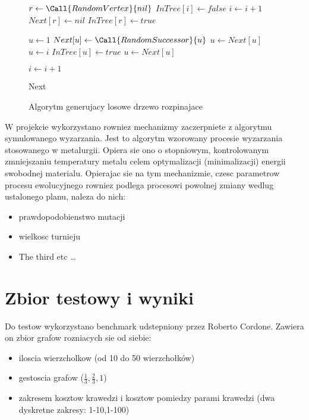 \documentclass[12pt]{article}
\begin{document}
\begin{figure}[h!]
 \centering
\begin{algorithmic}
\State $r\gets \Call{RandomVertex}{nil}$
	\State $InTree[i] \gets false $
	\State $i\gets i+1$
\EndFor
\State $Next[r] \gets nil $
\State $InTree[r] \gets true $


	\State $u \gets 1 $
    	\State $Next[u] \gets \Call{RandomSuccessor}{u}$
        \State $u \gets Next[u]$
    \EndWhile
    \State $u\gets i$
    	\State $InTree[u] \gets true$
        \State $u \gets Next[u]$
    \EndWhile
    
	\State $i\gets i+1$
\EndFor


\Return Next

\EndFunction

\end{algorithmic}
\caption{Algorytm generujacy losowe drzewo rozpinajace}
\end{figure}





W projekcie wykorzystano rowniez mechanizmy zaczerpniete z algorytmu symulowanego wyzarzania. Jest to algorytm wzorowany procesie wyzarzania stosowanego w metalurgii. Opiera sie ono o stopniowym, kontrolowanym zmniejszaniu temperatury metalu celem optymalizacji (minimalizacji) energii swobodnej materialu. Opierajac sie na tym mechanizmie, czesc parametrow procesu ewolucyjnego rowniez podlega procesowi powolnej zmiany wedlug ustalonego planu, naleza do nich:

\begin{itemize}
  \item prawdopodobienstwo mutacji
  \item wielkosc turnieju
  \item The third etc \ldots
\end{itemize}




 \section{Zbior testowy i wyniki}


 Do testow wykorzystano benchmark udstepniony przez Roberto Cordone. Zawiera on zbior grafow rozniacych sie od siebie:
 
 \begin{itemize}
  \item iloscia wierzcholkow (od 10 do 50 wierzchołków)
  \item gestoscia grafow ($\frac{1}{3}, \frac{2}{3}, 1$)
  \item zakresem kosztow krawedzi i kosztow pomiedzy parami krawedzi (dwa dyskretne zakresy: 1-10,1-100) 
\end{itemize}
\end{document}
